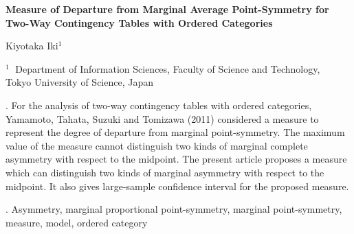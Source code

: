 \documentclass[12pt]{article}
\begin{document}
\begin{flushleft}


{\LARGE\bf Measure of Departure from Marginal Average Point-Symmetry for Two-Way Contingency Tables with Ordered Categories}


\vspace{1.0cm}

Kiyotaka Iki$^1$

\begin{description}

\item $^1 \;$  Department of Information Sciences, Faculty of Science and Technology, \\
Tokyo University of Science, Japan

\end{description}

\end{flushleft}


\vspace{0.75cm}

. For the analysis of two-way contingency tables with ordered categories, Yamamoto, Tahata, Suzuki and Tomizawa (2011) considered a measure to represent the degree of departure from marginal point-symmetry. The maximum value of the measure cannot distinguish two kinds of marginal complete asymmetry with respect to the midpoint. The present article proposes a measure which can distinguish two kinds of marginal asymmetry with respect to the midpoint. It also gives large-sample confidence interval for the proposed measure.

\vskip 2mm

.
Asymmetry, marginal proportional point-symmetry, marginal point-symmetry, measure, model, ordered category
\end{document}

